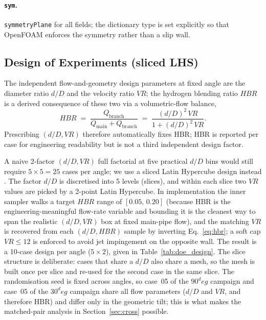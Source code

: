 \documentclass[11pt,a4paper]{article}
\def\dD{d/D}%
\def\VR{VR}%
\def\HBR{HBR}%
\def\circ{ deg}%
\newcommand{\dD}{\ensuremath{d/D}}
\newcommand{\VR}{\ensuremath{\mathrm{VR}}}
\newcommand{\HBR}{\ensuremath{\mathrm{HBR}}}
\begin{document}
\paragraph{\texttt{sym}.}\;
\texttt{symmetryPlane} for all fields; the dictionary type is set
explicitly so that OpenFOAM enforces the symmetry rather than a
slip wall.

\subsection{Design of Experiments (sliced LHS)}
\label{sec:method_doe}
The independent flow-and-geometry design parameters at fixed
angle are the diameter ratio \(\dD\) and the velocity ratio
\(\VR\); the hydrogen blending ratio \(\HBR\) is a derived
consequence of these two via a volumetric-flow balance,
\begin{equation}
\HBR \;=\;
\frac{Q_{\mathrm{branch}}}{Q_{\mathrm{main}}+Q_{\mathrm{branch}}}
\;=\; \frac{(\dD)^2\,\VR}{1+(\dD)^2\,\VR}.
\label{eq:hbr}
\end{equation}
Prescribing \((\dD,\VR)\) therefore automatically fixes \HBR{};
\HBR{} is reported per case for engineering readability but is
not a third independent design factor.

A naive 2-factor \((\dD,\VR)\) full factorial at five practical
\(\dD\) bins would still require \(5\times 5 = 25\) cases per
angle; we use a sliced Latin Hypercube design instead
\citep{ye2000sliced}. The factor \(\dD\) is discretised into 5
levels (slices), and within each slice two \(\VR\) values are
picked by a 2-point Latin Hypercube. In implementation the inner
sampler walks a target \(\HBR\) range of \([0.05,\,0.20]\)
(because \HBR{} is the engineering-meaningful flow-rate variable
and bounding it is the cleanest way to span the realistic
\((\dD,\VR)\) box at fixed main-pipe flow), and the matching
\(\VR\) is recovered from each \((\dD,\HBR)\) sample by inverting
Eq.~\ref{eq:hbr}; a soft cap \(\VR \le 12\) is enforced to avoid
jet impingement on the opposite wall. The result is a 10-case
design per angle (\(5\times 2\)), given in
Table~\ref{tab:doe_design}. The slice structure is deliberate:
cases that share a \(\dD\) also share a mesh, so the mesh is built
once per slice and re-used for the second case in the same slice.
The randomisation seed is fixed across angles, so case~05 of the
\(90^\circ\) campaign and case~05 of the \(30^\circ\) campaign
share all flow parameters (\(\dD\) and \(\VR\), and therefore
\HBR) and differ only in the geometric tilt; this is what makes
the matched-pair analysis in Section~\ref{sec:cross} possible.
\end{document}
